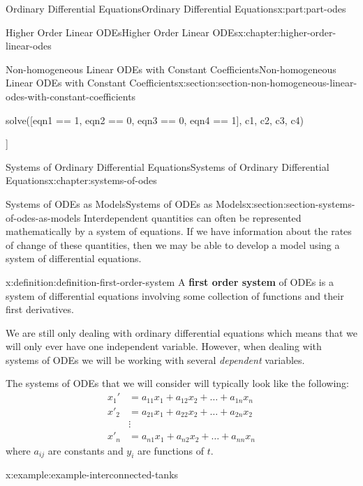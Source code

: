 \documentclass[oneside,10pt,]{book}
\newcommand{\terminology}[1]{\textbf{#1}}
\numberwithin{equation}{part}
\newcommand{\amp}{&}
\begin{document}
\begin{partptx}{Ordinary Differential Equations}{}{Ordinary Differential Equations}{}{}{x:part:part-odes}
\begin{chapterptx}{Higher Order Linear ODEs}{}{Higher Order Linear ODEs}{}{}{x:chapter:higher-order-linear-odes}
\begin{sectionptx}{Non-homogeneous Linear ODEs with Constant Coefficients}{}{Non-homogeneous Linear ODEs with Constant Coefficients}{}{}{x:section:section-non-homogeneous-linear-odes-with-constant-coefficients}
\begin{sageinput}
solve([eqn1 == 1, eqn2 == 0, eqn3 == 0, eqn4 == 1], c1, c2, c3, c4)
\end{sageinput}
\begin{sageoutput}
[[c1 == (1/6), c2 == (2/9), c3 == (-41/3530), c4 == (-43/3530)]]
\end{sageoutput}
\end{sectionptx}
\end{chapterptx}
%
\typeout{************************************************}
\typeout{************************************************}
%
\begin{chapterptx}{Systems of Ordinary Differential Equations}{}{Systems of Ordinary Differential Equations}{}{}{x:chapter:systems-of-odes}
%
%
\typeout{************************************************}
\typeout{************************************************}
%
\begin{sectionptx}{Systems of ODEs as Models}{}{Systems of ODEs as Models}{}{}{x:section:section-systems-of-odes-as-models}
Interdependent quantities can often be represented mathematically by a system of equations. If we have information about the rates of change of these quantities, then we may be able to develop a model using a system of differential equations.%
\begin{definition}{}{x:definition:definition-first-order-system}%
%
A \terminology{first order system} of ODEs is a system of differential equations involving some collection of functions and their first derivatives.%
\end{definition}
We are still only dealing with ordinary differential equations which means that we will only ever have one independent variable. However, when dealing with systems of ODEs we will be working with several \emph{dependent} variables.%
\par
The systems of ODEs that we will consider will typically look like the following:%
\begin{align*}
x_{1}'  \amp=  a_{11}x_{1} +a_{12}x_{2}+\dots+a_{1n}x_{n}\\
x'_{2}  \amp=  a_{21}x_{1} + a_{22}x_{2} + \dots + a_{2n}x_{2}\\
\amp\vdots\\
x'_{n}  \amp=  a_{n1}x_{1} + a_{n2}x_{2} + \dots + a_{nn}x_{n}
\end{align*}
where \(a_{ij}\) are constants and \(y_{i}\) are functions of \(t\).%
\begin{example}{}{x:example:example-interconnected-tanks}%

\end{example}
\end{sectionptx}
\end{chapterptx}
\end{partptx}
\end{document}
